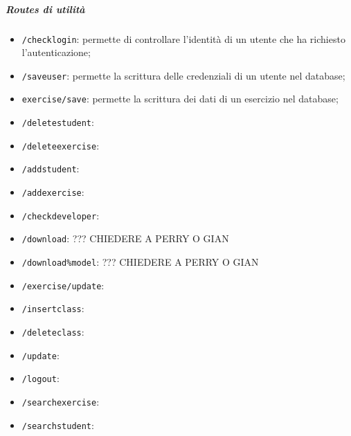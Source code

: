 \subparagraph*{Routes di utilità}
\begin{itemize}
	\item \texttt{/checklogin}: permette di controllare l'identità di un utente che ha richiesto l'autenticazione;
	\item \texttt{/saveuser}: permette la scrittura delle credenziali di un utente nel database;
	\item \texttt{exercise/save}: permette la scrittura dei dati di un esercizio nel database;
	\item \texttt{/deletestudent}:
	\item \texttt{/deleteexercise}:
	\item \texttt{/addstudent}:
	\item \texttt{/addexercise}:
	\item \texttt{/checkdeveloper}:
	\item \texttt{/download}: ??? CHIEDERE A PERRY O GIAN
	\item \texttt{/download\%model}: ??? CHIEDERE A PERRY O GIAN
	\item \texttt{/exercise/update}:
	\item \texttt{/insertclass}:
	\item \texttt{/deleteclass}:
	\item \texttt{/update}:
	\item \texttt{/logout}:
	\item \texttt{/searchexercise}:
	\item \texttt{/searchstudent}:
	
	
\end{itemize}
